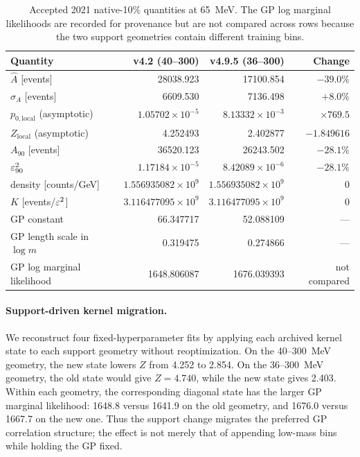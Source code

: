 \begin{table}[H]
  \centering
  \footnotesize
  \caption{Accepted 2021 native-10\% quantities at 65~MeV.  The GP log marginal
  likelihoods are recorded for provenance but are not compared across rows because
  the two support geometries contain different training bins.}
  \label{tab:v4p9p7-m65-exact}
  \begin{tabular}{lrrr}
    \toprule
    Quantity & v4.2 (40--300) & v4.9.5 (36--300) & Change \\
    \midrule
    $\widehat A$ [events] & 28038.923 & 17100.854 & $-39.0\%$ \\
    $\sigma_A$ [events] & 6609.530 & 7136.498 & $+8.0\%$ \\
    $p_{0,\mathrm{local}}$ (asymptotic) & $1.05702\times10^{-5}$ & $8.13332\times10^{-3}$ & $\times769.5$ \\
    $Z_{\mathrm{local}}$ (asymptotic) & 4.252493 & 2.402877 & $-1.849616$ \\
    $A_{90}$ [events] & 36520.123 & 26243.502 & $-28.1\%$ \\
    $\varepsilon^2_{90}$ & $1.17184\times10^{-5}$ & $8.42089\times10^{-6}$ & $-28.1\%$ \\
    density [counts/GeV] & $1.556935082\times10^9$ & $1.556935082\times10^9$ & 0 \\
    $K$ [events/$\varepsilon^2$] & $3.116477095\times10^9$ & $3.116477095\times10^9$ & 0 \\
    GP constant & 66.347717 & 52.088109 & --- \\
    GP length scale in $\log m$ & 0.319475 & 0.274866 & --- \\
    GP log marginal likelihood & 1648.806087 & 1676.039393 & not compared \\
    \bottomrule
  \end{tabular}
\end{table}

\paragraph{Support-driven kernel migration.}

We reconstruct four fixed-hyperparameter fits by applying each archived kernel state
to each support geometry without reoptimization.  On the 40--300~MeV geometry, the
new state lowers $Z$ from 4.252 to 2.854.  On the 36--300~MeV geometry, the old state
would give $Z=4.740$, while the new state gives 2.403.  Within each geometry, the
corresponding diagonal state has the larger GP marginal likelihood: 1648.8 versus
1641.9 on the old geometry, and 1676.0 versus 1667.7 on the new one.  Thus the
support change migrates the preferred GP correlation structure; the effect is not
merely that of appending low-mass bins while holding the GP fixed.

